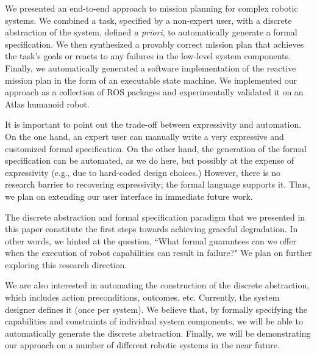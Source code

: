 
\addtolength{\textheight}{-13 pt}   %

We presented an end-to-end approach to mission planning for complex robotic systems.
We combined a task, specified by a non-expert user, with a discrete abstraction of the system, defined \emph{a priori}, to automatically generate a formal specification.
We then synthesized a provably correct mission plan that achieves the task's goals or reacts to any failures in the low-level system components.
Finally, we automatically generated a software implementation of the reactive mission plan in the form of an executable state machine.
We implemented our approach as a collection of ROS packages and experimentally validated it on an Atlas humanoid robot.

It is important to point out the trade-off between expressivity and automation.
On the one hand, an expert user can manually write a very expressive and customized formal specification.
On the other hand, the generation of the formal specification can be automated, as we do here, but possibly at the expense of expressivity (e.g., due to hard-coded design choices.)
However, there is no research barrier to recovering expressivity; the formal language supports it.
Thus, we plan on extending our user interface in immediate future work.

The discrete abstraction and formal specification paradigm that we presented in this paper constitute the first steps towards achieving graceful degradation.
In other words, we hinted at the question, ``What formal guarantees can we offer when the execution of robot capabilities can result in failure?"
We plan on further exploring this research direction.

We are also interested in automating the construction of the discrete abstraction, which includes action preconditions, outcomes, etc.
Currently, the system designer defines it (once per system).
We believe that, by formally specifying the capabilities and constraints of individual system components, we will be able to automatically generate the discrete abstraction.
Finally, we will be demonstrating our approach on a number of different robotic systems in the near future.

